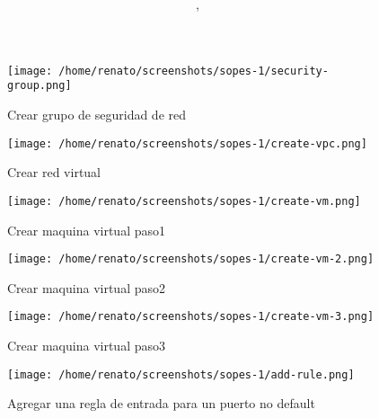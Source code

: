 \documentclass{article}
\author{\nombre , \carnet}
\title{\textbf{\Huge\titulo}}
\begin{document}
\maketitle

\begin{figure}[h]
        \texttt{[image: /home/renato/screenshots/sopes-1/security-group.png]}
                 \caption{Crear grupo de seguridad de red}
\end{figure}	
\pagebreak
\begin{figure}[h]
        \texttt{[image: /home/renato/screenshots/sopes-1/create-vpc.png]}
                 \caption{Crear red virtual}
\end{figure}
\pagebreak

\begin{figure}[h]
        \texttt{[image: /home/renato/screenshots/sopes-1/create-vm.png]}
                 \caption{Crear maquina virtual paso1}
\end{figure}
\pagebreak
\begin{figure}[h]
        \texttt{[image: /home/renato/screenshots/sopes-1/create-vm-2.png]}
                 \caption{Crear maquina virtual paso2}
\end{figure}	
\pagebreak

\begin{figure}[h]
        \texttt{[image: /home/renato/screenshots/sopes-1/create-vm-3.png]}
                 \caption{Crear maquina virtual paso3}
\end{figure}
\pagebreak
\begin{figure}[h]
        \texttt{[image: /home/renato/screenshots/sopes-1/add-rule.png]}
                 \caption{Agregar una regla de entrada para un puerto no default}
\end{figure}	
\end{document}

